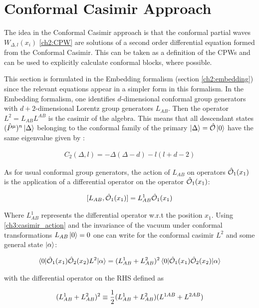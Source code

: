 \section{Conformal Casimir Approach}
The idea in the Conformal Casimir approach is that the conformal partial waves $W_{\Delta,l}(x_i)$ \ref{ch2:CPW} are solutions of a second order differential equation formed from the Conformal Casimir. This can be taken as a definition of the CPWs and can be used to explicitly calculate conformal blocks, where possible.

This section is formulated in the Embedding formalism (section \ref{ch2:embedding}) since the relevant equations appear in a simpler form in this formalism. In the Embedding formalism, one identifies $d$-dimensional conformal group generators with $d+2$-dimensional Lorentz group generators $L_{AB}$. Then the operator $L^2=L_{AB}L^{AB}$ is the casimir of the algebra. This means that all descendant states $(\hat{P}^\mu)^n\ket{\Delta}$ belonging to the conformal family of the primary $\ket{\Delta} = \hat{\mathcal{{O}}}\ket{0}$ have the same eigenvalue given by \cite{Dolan:2000ut}: 

\begin{align}
 C_2(\Delta,l)= - \Delta(\Delta-d)-l(l+d-2)
\end{align}

As for usual conformal group generators, the action of $L_{AB}$ on operators $\hat{\mathcal{{O}}}_1(x_1)$ is the application of a differential operator on the operator $\hat{\mathcal{{O}}}_1(x_1)$:

\begin{align} \label{ch3:casimir_action}
 [L_{AB},\hat{\mathcal{{O}}}_1(x_1)] = L^1_{AB}\hat{\mathcal{{O}}}_1(x_1)
\end{align}

Where $L_{AB}^1$ represents the differential operator w.r.t the position $x_1$. Using \ref{ch3:casimir_action} and the invariance of the vacuum under conformal transformations $L_{AB}\ket{0}=0$ one can write for the conformal casimir $L^2$ and some general state $\ket{\alpha}$:

\begin{align} \label{ch3:differential_casimir}
 \braket{0|\hat{\mathcal{{O}}}_1(x_1)\hat{\mathcal{{O}}}_2(x_2)L^2|\alpha} = (L_{AB}^1+L_{AB}^2)^2\braket{0|\hat{\mathcal{{O}}}_1(x_1)\hat{\mathcal{{O}}}_2(x_2)|\alpha}
\end{align}

with the differential operator on the RHS defined as 

\begin{align}
 (L_{AB}^1+L_{AB}^2)^2 \equiv \frac{1}{2}(L_{AB}^1+L_{AB}^2)(\tensor[]{L}{^1^{AB}}+\tensor[]{L}{^2^{AB}})
\end{align}

